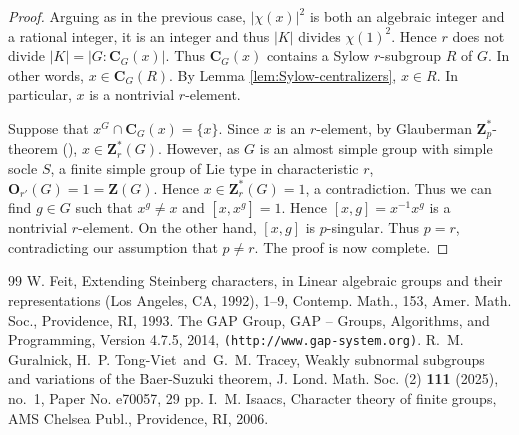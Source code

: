 \documentclass[10pt,a4paper]{amsart}
\newcommand{\CB}{\mathbf{C}}
\newcommand{\OB}{\mathbf{O}}
\newcommand{\ZB}{\mathbf{Z}}
\begin{document}
\begin{proof}
Arguing as in the previous case, $|\chi(x)|^2$ is both an algebraic integer and a rational integer, it is an integer and thus $|K|$ divides $\chi(1)^2$. Hence $r$ does not divide $|K|=|G:\CB_G(x)|$. Thus $\CB_G(x)$ contains a Sylow $r$-subgroup $R$ of $G$. In other words, $x\in \CB_G(R)$. By Lemma \ref{lem:Sylow-centralizers}, $x\in R$. In particular, $x$ is a nontrivial $r$-element.    
 
 Suppose that $x^G\cap \CB_G(x)=\{x\}$. Since $x$ is an $r$-element, by Glauberman $\ZB_p^*$-theorem (\cite[Theorem 5.1]{GTT}), $x\in \ZB_r^*(G)$. However, as $G$ is an almost simple group with simple socle $S$, a finite simple group of Lie type in characteristic $r$, $\OB_{r'}(G)=1=\ZB(G)$. Hence $x\in \ZB_r^*(G)=1$, a contradiction.  Thus we can find $g\in G$ such that $x^g\neq x$ and $[x,x^g]=1$. Hence $[x,g]=x^{-1}x^g$ is a nontrivial $r$-element. On the other hand, $[x,g]$ is $p$-singular. Thus $p=r$, contradicting our assumption that $p\neq r.$  The proof is now complete.
\end{proof}

\begin{thebibliography}{99}
 W. Feit, Extending Steinberg characters, in { Linear algebraic groups and their representations (Los Angeles, CA, 1992)}, 1--9, Contemp. Math., 153, Amer. Math. Soc., Providence, RI, 1993.
 The GAP Group, {GAP -- Groups, Algorithms, and Programming, Version 4.7.5}, 2014, \texttt{(http://www.gap-system.org)}.
 R.~M. Guralnick, H.~P. Tong-Viet\ and\ G.~M. Tracey, Weakly subnormal subgroups and variations of the Baer-Suzuki theorem, J. Lond. Math. Soc. (2) {\bf 111} (2025), no.~1, Paper No. e70057, 29 pp.
 I.~M. Isaacs, {Character theory of finite groups}, AMS Chelsea Publ., Providence, RI, 2006.
\end{thebibliography}
\end{document}
